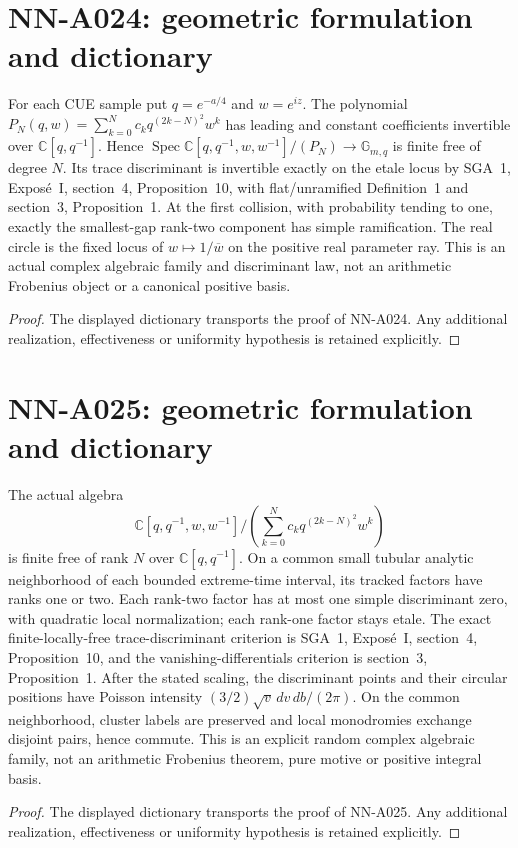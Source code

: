\section{NN-A024: geometric formulation and dictionary}
\begin{geometricstatement}[NN-A024]
For each CUE sample put $q=e^{-a/4}$ and $w=e^{iz}$. The polynomial $P_N(q,w)=\sum_{k=0}^N c_k q^{(2k-N)^2}w^k$ has leading and constant coefficients invertible over $\mathbb C[q,q^{-1}]$. Hence $\operatorname{Spec}\mathbb C[q,q^{-1},w,w^{-1}]/(P_N)\to\mathbb G_{m,q}$ is finite free of degree $N$. Its trace discriminant is invertible exactly on the etale locus by SGA~1, Expos\'e~I, section~4, Proposition~10, with flat/unramified Definition~1 and section~3, Proposition~1. At the first collision, with probability tending to one, exactly the smallest-gap rank-two component has simple ramification. The real circle is the fixed locus of $w\mapsto1/\overline w$ on the positive real parameter ray. This is an actual complex algebraic family and discriminant law, not an arithmetic Frobenius object or a canonical positive basis.
\end{geometricstatement}
\begin{proof} The displayed dictionary transports the proof of NN-A024. Any additional realization, effectiveness or uniformity hypothesis is retained explicitly.\end{proof}


\section{NN-A025: geometric formulation and dictionary}
\begin{geometricstatement}[NN-A025]
The actual algebra \[\mathbb C[q,q^{-1},w,w^{-1}]/\left(\sum_{k=0}^Nc_kq^{(2k-N)^2}w^k\right)\] is finite free of rank $N$ over $\mathbb C[q,q^{-1}]$. On a common small tubular analytic neighborhood of each bounded extreme-time interval, its tracked factors have ranks one or two. Each rank-two factor has at most one simple discriminant zero, with quadratic local normalization; each rank-one factor stays etale. The exact finite-locally-free trace-discriminant criterion is SGA~1, Expos\'e~I, section~4, Proposition~10, and the vanishing-differentials criterion is section~3, Proposition~1. After the stated scaling, the discriminant points and their circular positions have Poisson intensity $(3/2)\sqrt v\,dv\,db/(2\pi)$. On the common neighborhood, cluster labels are preserved and local monodromies exchange disjoint pairs, hence commute. This is an explicit random complex algebraic family, not an arithmetic Frobenius theorem, pure motive or positive integral basis.
\end{geometricstatement}
\begin{proof} The displayed dictionary transports the proof of NN-A025. Any additional realization, effectiveness or uniformity hypothesis is retained explicitly.\end{proof}


